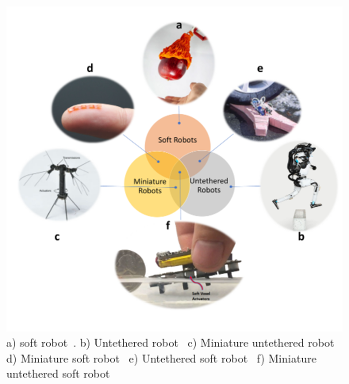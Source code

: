 \begin{figure}[!ht]
      \centering
      \includegraphics[width=\textwidth]{venn.pdf}
      \caption[] {a) soft robot~\cite{Li2019}. b) Untethered robot~ c) Miniature untethered robot~\cite{Jafferis2019} d) Miniature soft robot~\cite{Tingting2012} e) Untethered soft robot~\cite{Tolley2014d} f) Miniature untethered soft robot~\cite{Khodambashi2021untethered}}
      \label{fig:venn}
\end{figure}

